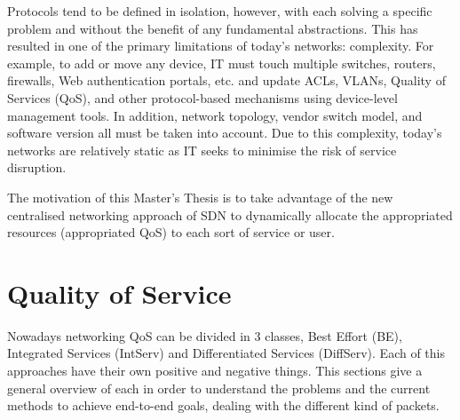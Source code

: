 
Protocols tend to be defined in isolation, however, with each solving a specific problem and without the benefit of any fundamental abstractions. This has resulted in one of the primary limitations of today's networks: complexity. For example, to add or move any device, IT must touch 
multiple switches, routers, firewalls, Web authentication portals, etc. and update ACLs, VLANs, Quality of Services (QoS), and other protocol-based mechanisms using device-level management tools. In addition, network topology, vendor switch model, and software version all must be taken into 
account. Due to this complexity, today's networks are relatively static as IT seeks to minimise the risk of service disruption.

The motivation of this Master's Thesis is to take advantage of the new centralised networking approach of SDN to dynamically allocate the appropriated resources (appropriated QoS) to each sort of service or user.    





\section{Quality of Service}
\label{sec:qos}

Nowadays networking QoS can be divided in 3 classes, Best Effort (BE), Integrated Services (IntServ) and Differentiated Services (DiffServ). Each of this approaches have their own positive and negative things. This sections give a general overview of each in order to understand the problems and the current methods to achieve end-to-end goals, dealing with the different kind of packets.

